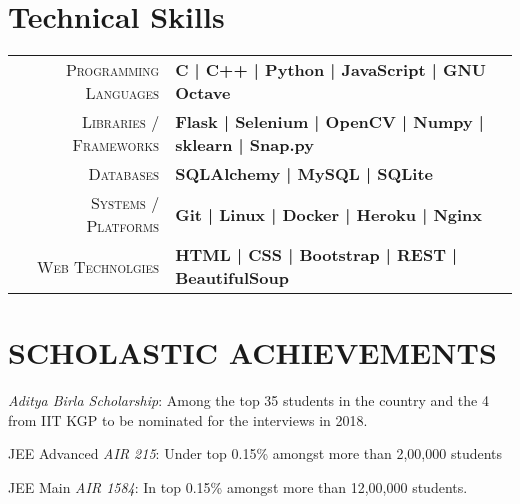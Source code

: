\documentclass[]{deedy-resume-openfont}
\begin{document}
\begin{minipage}[t]{0.66\textwidth}
\begin{tightemize}
\end{tightemize}
\sectionsep


\section{Technical Skills}
\begin{tabular}{r|p{15cm}}
\textsc{Programming Languages} & \textbf{ C | C++ | Python | JavaScript | GNU Octave} \\
\textsc{Libraries / Frameworks} & \textbf{Flask | Selenium | OpenCV | Numpy | sklearn | Snap.py }\\
\textsc{Databases} & \textbf{SQLAlchemy | MySQL | SQLite}\\
\textsc{Systems / Platforms} & \textbf{Git | Linux | Docker | Heroku | Nginx}\\ 
\textsc{Web Technolgies} & \textbf{HTML | CSS | Bootstrap | REST | BeautifulSoup
} \\
\end{tabular}

\section{SCHOLASTIC ACHIEVEMENTS}

\vspace{\topsep} %
\begin{tightemize}

\item {\emph{Aditya Birla Scholarship}:} Among the top 35 students in the country and the 4 from IIT KGP to be nominated for the interviews in 2018.\\
\item{JEE Advanced \emph{AIR 215}:} Under top 0.15\% amongst more than 2,00,000 students \\
\item {JEE Main \emph{AIR 1584}:} In top 0.15\% amongst more than 12,00,000 students. \\
\end{tightemize}
\sectionsep



\end{minipage}
\end{document}
